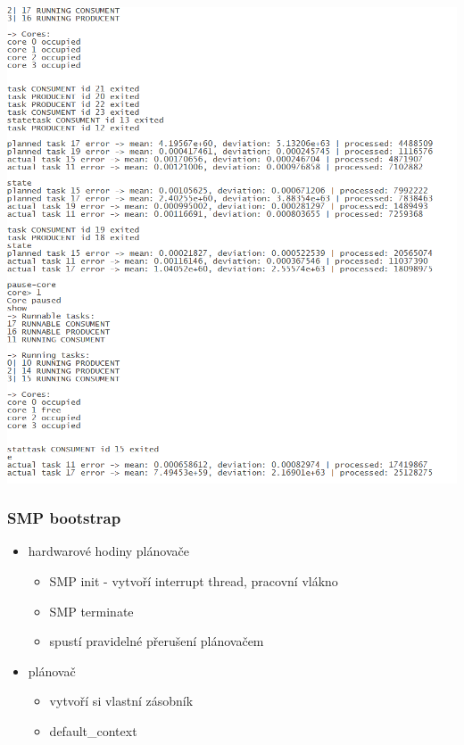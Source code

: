\documentclass{beamer}
\begin{document}
\begin{frame} 
\includegraphics[height=\textheight]{obrazky/screen.png}

\end{frame}

\begin{frame}
\frametitle{SMP bootstrap}

\begin{itemize}
\item hardwarové hodiny plánovače
\begin{itemize}
  \item SMP init - vytvoří interrupt thread, pracovní vlákno
  \item SMP terminate
  \item spustí pravidelné přerušení plánovačem
\end{itemize}
\item plánovač

\begin{itemize}
  \item vytvoří si vlastní zásobník
  \item default\_context
\end{itemize}
\end{itemize}
\end{frame}
\end{document}
